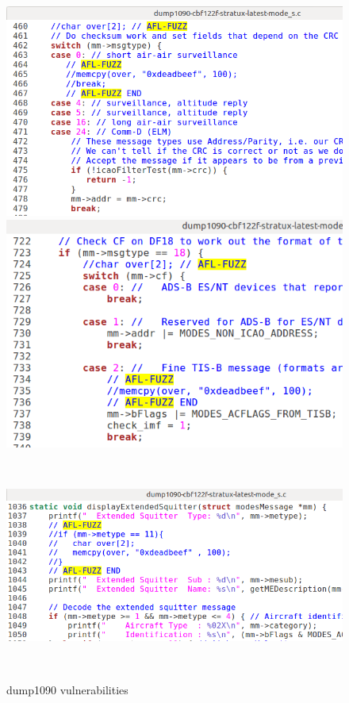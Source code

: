 \documentclass[../main.tex]{subfiles}
\begin{document}
\begin{figure}[htp]
\centering
\begin{minipage}{.5\textwidth}
  \centering
  \includegraphics[scale=0.4]{images/src_dump1090-cbf122f-stratux-latest-vuln0.png}
\end{minipage}%
\begin{minipage}{.5\textwidth}
  \centering
  \vspace*{-0.22in}
  \includegraphics[scale=0.4]{images/src_dump1090-cbf122f-stratux-latest-vuln1.png}
  \end{minipage}\\
  \begin{minipage}{.5\textwidth}
    \hspace*{-0.3in}
    \includegraphics[scale=0.45]{images/src_dump1090-cbf122f-stratux-latest-vuln2.png}
    \end{minipage}\\
\caption{dump1090 vulnerabilities}
\label{fig:1090vuln}
\end{figure}
\end{document}
